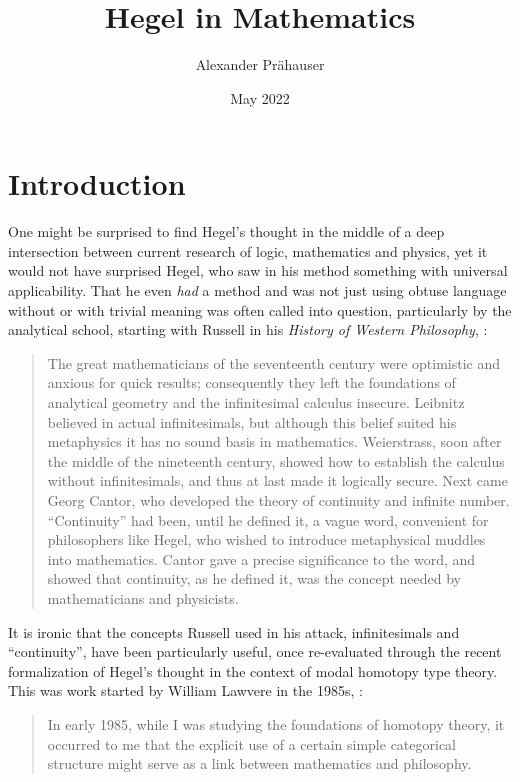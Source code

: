 \documentclass{article}
\title{Hegel in Mathematics}
\author{Alexander Prähauser}
\date{May 2022}
\begin{document}
\maketitle

\tableofcontents

\section{Introduction}
One might be surprised to find Hegel's thought in the middle of a deep intersection between current research
of logic, mathematics and physics, yet it would not have surprised Hegel, who saw in his method something
with universal applicability. That he even \emph{had} a method and was not just using obtuse language
without or with trivial meaning was often called into question, particularly by the analytical school,
starting with Russell in his \emph{History of Western Philosophy}, \cite{Russ}:

\begin{quote}
    The great mathematicians of the seventeenth century were optimistic and anxious for quick results;
consequently they left the foundations of analytical geometry and the infinitesimal calculus insecure.
Leibnitz believed in actual infinitesimals, but although this belief suited his metaphysics it has no
sound basis in mathematics. Weierstrass, soon after the middle of the nineteenth century, showed how to
establish the calculus without infinitesimals, and thus at last made it logically secure. Next came Georg
Cantor, who developed the theory of continuity and infinite number. ``Continuity'' had been, until he
defined it, a vague word, convenient for philosophers like Hegel, who wished to introduce metaphysical
muddles into mathematics. Cantor gave a precise significance to the word, and showed that continuity,
as he defined it, was the concept needed by mathematicians and physicists.
\end{quote}

It is ironic that the concepts Russell used in his attack, infinitesimals and ``continuity'', have been
particularly useful, once re-evaluated through the recent formalization of Hegel's thought in the context
of modal homotopy type theory. This was work started by William Lawvere in the 1985s, \cite{Law96}:

\begin{quote}
    In early 1985, while I was studying the foundations of homotopy theory, it occurred to me that the
explicit use of a certain simple categorical structure might serve as a link between mathematics and philosophy.

\end{quote}
\end{document}
